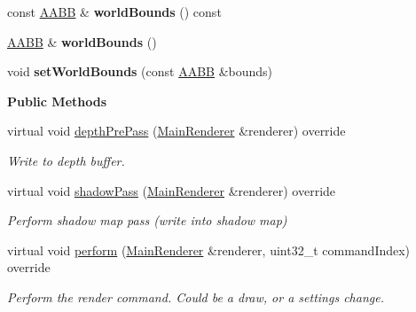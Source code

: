 \begin{Indent}
\begin{DoxyCompactItemize}
const \mbox{\hyperlink{classrev_1_1_a_a_b_b}{A\+A\+BB}} \& {\bfseries world\+Bounds} () const
\item 
\mbox{\label{classrev_1_1_draw_command_a30427808f9ba12a75274f40065e40343}} 
\mbox{\hyperlink{classrev_1_1_a_a_b_b}{A\+A\+BB}} \& {\bfseries world\+Bounds} ()
\item 
\mbox{\label{classrev_1_1_draw_command_a40faf35970224e5d2ef4554c712845fe}} 
void {\bfseries set\+World\+Bounds} (const \mbox{\hyperlink{classrev_1_1_a_a_b_b}{A\+A\+BB}} \&bounds)
\end{DoxyCompactItemize}
\end{Indent}
\begin{Indent}\textbf{ Public Methods}\par
\begin{DoxyCompactItemize}
\item 
\mbox{\label{classrev_1_1_draw_command_ab6b729b17073e5e8d0e605b3795c9159}} 
virtual void \mbox{\hyperlink{classrev_1_1_draw_command_ab6b729b17073e5e8d0e605b3795c9159}{depth\+Pre\+Pass}} (\mbox{\hyperlink{classrev_1_1_main_renderer}{Main\+Renderer}} \&renderer) override
\begin{DoxyCompactList}\small\item\em Write to depth buffer. \end{DoxyCompactList}\item 
\mbox{\label{classrev_1_1_draw_command_aa1192c05ad956275dd12674544b457b1}} 
virtual void \mbox{\hyperlink{classrev_1_1_draw_command_aa1192c05ad956275dd12674544b457b1}{shadow\+Pass}} (\mbox{\hyperlink{classrev_1_1_main_renderer}{Main\+Renderer}} \&renderer) override
\begin{DoxyCompactList}\small\item\em Perform shadow map pass (write into shadow map) \end{DoxyCompactList}\item 
\mbox{\label{classrev_1_1_draw_command_af16f5dcf5a8373241af0bbfa524f3ff7}} 
virtual void \mbox{\hyperlink{classrev_1_1_draw_command_af16f5dcf5a8373241af0bbfa524f3ff7}{perform}} (\mbox{\hyperlink{classrev_1_1_main_renderer}{Main\+Renderer}} \&renderer, uint32\+\_\+t command\+Index) override
\begin{DoxyCompactList}\small\item\em Perform the render command. Could be a draw, or a settings change. \end{DoxyCompactList}\item 

\end{DoxyCompactItemize}
\end{Indent}
